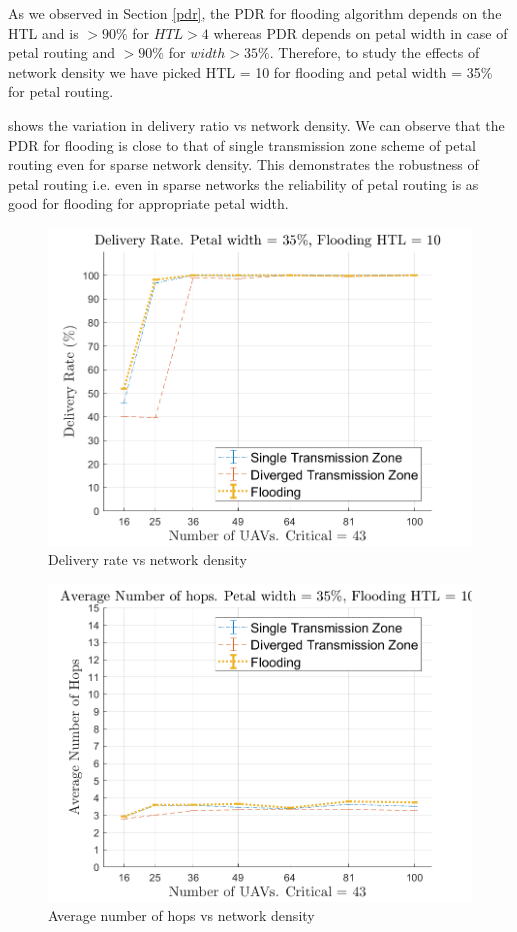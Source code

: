 As we observed in Section \ref{pdr}, the PDR for flooding algorithm depends on the HTL and is $>90\%$ for $HTL>4$ whereas PDR depends on petal width in case of petal routing and $>90\%$ for $width>35\%$. 
Therefore, to study the effects of network density we have picked HTL = 10 for flooding and petal width = 35\% for petal routing. 

 shows the variation in delivery ratio vs network density. We can observe that the PDR for flooding is close to that of single transmission zone scheme of petal routing even for sparse network density. This demonstrates the robustness of petal routing i.e. even in sparse networks the reliability of petal routing is as good for flooding for appropriate petal width.

\begin{figure}[hbtp]
\centering
\includegraphics[width=\simResultFigSize\textwidth]{ncsuthesis-0.6/Chapter-5/figs/ND_DR}
\caption{Delivery rate vs network density}
\label{fig:nd_DR}
\end{figure}

\begin{figure}[hbtp]
\centering
\includegraphics[width=\simResultFigSize\textwidth]{ncsuthesis-0.6/Chapter-5/figs/ND_hops}
\caption{Average number of hops vs network density}
\label{fig:ND_hops}
\end{figure}

